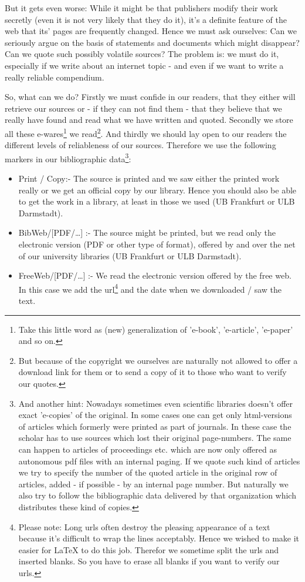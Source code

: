 But it gets even worse: While it might be that publishers modify their work
secretly (even it is not very likely that they do it), it's a definite feature
of the web that its' pages are fre\-quen\-tly changed. Hence we must ask
ourselves: Can we seriously argue on the basis of statements and documents which
might disappear? Can we quote such possibly volatile sources? The problem is: we
must do it, especially if we write about an internet topic - and even if we want
to write a really reliable compendium.

So, what can we do? Firstly we must confide in our readers, that they either
will retrieve our sources or - if they can not find them - that they
believe that we really have found and read what we have written and
quoted. Secondly we store all these e-wares\footnote{Take this little word as
(new) generalization of 'e-book', 'e-article', 'e-paper' and so on.} we
read\footnote{But because of the copyright we ourselves are naturally not
allowed to offer a download link for them or to send a copy of it to those who
want to verify our quotes.}. And thirdly we should lay open to our readers the
different levels of reliableness of our sources. Therefore we use
the following markers in our bibliographic data\footnote{And another hint: Nowadays sometimes
even scientific libraries doesn't offer exact 'e-copies' of the original. In
some cases one can get only html-versions of articles which formerly were
printed as part of journals. In these case the scholar has to use sources which
lost their original page-numbers. The same can happen to articles of proceedings
etc. which are now only offered as autonomous pdf files with an internal paging.
If we quote such kind of articles we try to specify the number of the quoted
article in the original row of articles, added - if possible - by an internal
page number. But naturally we also try to follow the bibliographic data
delivered by that organization which distributes these kind of copies.}:

\begin{itemize}
	\item Print / Copy:- The source is printed and we saw either the printed work
	really or we get an official copy by our library. Hence you should also be able
	to get the work in a library, at least in those we used (UB Frankfurt or ULB
	Darmstadt).
	\item BibWeb/[PDF/\ldots] :- The source might be printed, but we read only the
	electronic version (PDF or other type of format), offered by and over the
	net of our university libraries (UB Frankfurt or ULB Darmstadt).
  \item FreeWeb/[PDF/\ldots] :- We read the electronic version offered by the
  free web. In this case we add the url\footnote{Please note: Long urls often
  destroy the pleasing appearance of a text because it's difficult to wrap the
  lines acceptably. Hence we wished to make it easier for LaTeX to do this job.
  Therefor we sometime split the urls and inserted blanks. So you have to erase
  all blanks if you want to verify our urls.} and the date when we downloaded /
  saw the text.
\end{itemize}
